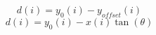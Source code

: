 \documentclass[../main.tex]{subfiles}%
\begin{document}
%
    \Xequation%
    \begin{equation*}%
        d(i) 
        = y_{0}(i) - y_{offset}(i)
    \end{equation*}%
    \begin{equation}%
        d(i) 
        = y_{0}(i) - x(i) \tan(\theta)
        \label{eq:edge-alignment}%
    \end{equation}%
\end{document}
